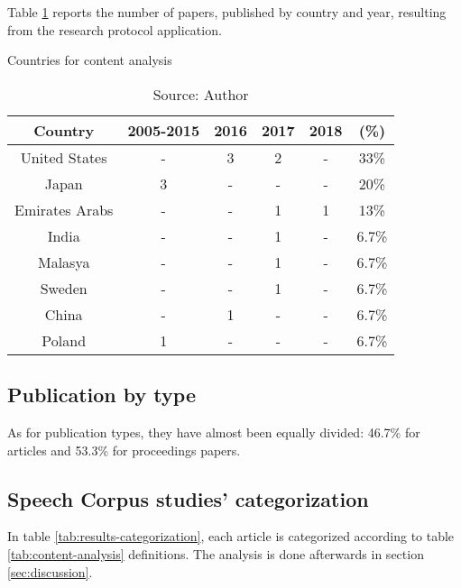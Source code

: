 Table \ref{tab:country-analysis} reports the number of papers, published by country and year, resulting from the research protocol application.

\begin{table}[ht]
    \centering
    \caption{Countries for content analysis}
    \begin{tabular}{|c|c|c|c|c|c|}
        \hline Country & 2005-2015 & 2016 & 2017 & 2018 & (\%) \\ \hline
        United States & - & 3 & 2 & - & 33\% \\ \hline 
        Japan & 3 & - & - & - & 20\% \\ \hline
        Emirates Arabs & - & - & 1 & 1 & 13\% \\ \hline
        India & - & - & 1 & - & 6.7\% \\ \hline
        Malasya & - & - & 1 & - & 6.7\% \\ \hline
        Sweden & - & - & 1 & - & 6.7\% \\ \hline
        China & - & 1 & - & - & 6.7\% \\ \hline
        Poland & 1 & - & - & - & 6.7\% \\ \hline
    \end{tabular}
    \caption*{Source: Author}
    \label{tab:country-analysis}
\end{table}

\subsection{Publication by type}

As for publication types, they have almost been equally divided: 46.7\% for articles and 53.3\% for proceedings papers.

\subsection{Speech Corpus studies' categorization}

In table \ref{tab:results-categorization}, each article is categorized according to table \ref{tab:content-analysis} definitions. The analysis is done afterwards in section \ref{sec:discussion}.

